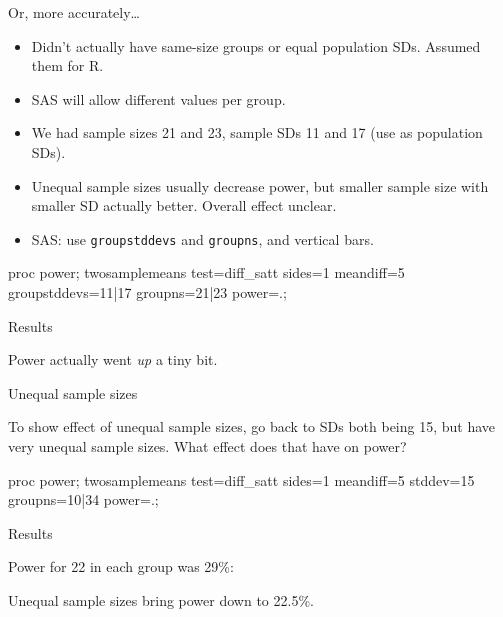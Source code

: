 \documentclass[unknownkeysallowed]{beamer}\usepackage[]{graphicx}\usepackage[]{color}
\begin{document}
\begin{frame}[fragile]{Or, more accurately\ldots}

  \begin{itemize}
  \item Didn't actually have same-size groups or equal population
    SDs. Assumed them for R.
  \item SAS will allow different values per group.
  \item We had sample sizes 21 and 23, sample SDs 11 and 17 (use as
    population SDs).
  \item Unequal sample sizes usually decrease power, but smaller
    sample size with smaller SD actually better. Overall effect unclear.
  \item SAS: use \texttt{groupstddevs} and \texttt{groupns}, and
    vertical bars.
  \end{itemize}

\begin{Sascode}[store=il,fontsize=footnotesize]
  proc power;
  twosamplemeans
    test=diff_satt
    sides=1
    meandiff=5
    groupstddevs=11|17
    groupns=21|23
    power=.;
\end{Sascode}

  
\end{frame}

\begin{frame}[fragile]{Results}


Power actually went \emph{up} a tiny bit.

  
\end{frame}

\begin{frame}[fragile]{Unequal sample sizes}

To show effect of unequal sample sizes, go back to SDs both being 15,
but have very unequal sample sizes. What effect does that have on
power?


\begin{Sascode}[store=im]
  proc power;
  twosamplemeans
    test=diff_satt
    sides=1
    meandiff=5
    stddev=15
    groupns=10|34
    power=.;
\end{Sascode}

  
\end{frame}

\begin{frame}[fragile]{Results}

Power for 22 in each group was 29\%:


Unequal sample sizes bring power down to 22.5\%.
  
\end{frame}
\end{document}
